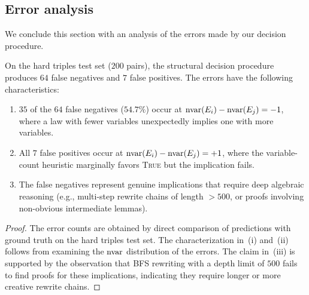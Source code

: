 \subsection{Error analysis}

We conclude this section with an analysis of the errors made by our decision
procedure.

\begin{proposition}\label{prop:errors}
On the hard triples test set ($200$ pairs), the structural decision procedure
produces $64$ false negatives and $7$ false positives.  The errors have the
following characteristics:
\begin{enumerate}[label=(\roman*)]
\item $35$ of the $64$ false negatives ($54.7\%$) occur at
  $\mathrm{nvar}(E_i) - \mathrm{nvar}(E_j) = -1$, where a law with fewer variables
  unexpectedly implies one with more variables.
\item All $7$ false positives occur at $\mathrm{nvar}(E_i) - \mathrm{nvar}(E_j) = +1$, where
  the variable-count heuristic marginally favors \textsc{True} but the
  implication fails.
\item The false negatives represent genuine implications that require deep
  algebraic reasoning (e.g., multi-step rewrite chains of length $> 500$,
  or proofs involving non-obvious intermediate lemmas).
\end{enumerate}
\end{proposition}

\begin{proof}
The error counts are obtained by direct comparison of predictions with ground
truth on the hard triples test set.  The characterization in~(i) and~(ii) follows
from examining the $\mathrm{nvar}$ distribution of the errors.  The claim in~(iii) is
supported by the observation that BFS rewriting with a depth limit of $500$
fails to find proofs for these implications, indicating they require longer or
more creative rewrite chains.
\end{proof}

